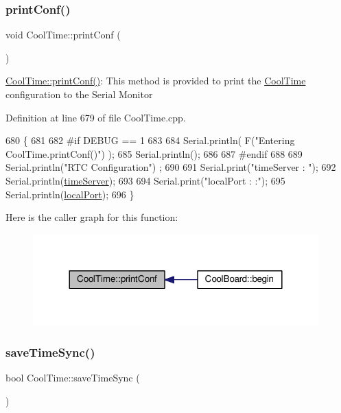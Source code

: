 \subsubsection{\texorpdfstring{print\+Conf()}{printConf()}}
{\footnotesize\ttfamily void Cool\+Time\+::print\+Conf (\begin{DoxyParamCaption}{ }\end{DoxyParamCaption})}

\hyperlink{class_cool_time_af355e7f9b3898211cd2ff25eab5933b1}{Cool\+Time\+::print\+Conf()}\+: This method is provided to print the \hyperlink{class_cool_time}{Cool\+Time} configuration to the Serial Monitor 

Definition at line 679 of file Cool\+Time.\+cpp.


\begin{DoxyCode}
680 \{
681 
682 \textcolor{preprocessor}{#if DEBUG == 1}
683 
684     Serial.println( F(\textcolor{stringliteral}{"Entering CoolTime.printConf()"}) );
685     Serial.println();
686 
687 \textcolor{preprocessor}{#endif }
688 
689     Serial.println(\textcolor{stringliteral}{"RTC Configuration"}) ;
690 
691     Serial.print(\textcolor{stringliteral}{"timeServer : "});
692     Serial.println(\hyperlink{class_cool_time_ad2b9858f399108cb440dd1e908916f04}{timeServer});
693     
694     Serial.print(\textcolor{stringliteral}{"localPort : :"});
695     Serial.println(\hyperlink{class_cool_time_a2f777da44d7ba678be8185299e9b49d1}{localPort});
696 \}
\end{DoxyCode}
Here is the caller graph for this function\+:\nopagebreak
\begin{figure}[H]
\begin{center}
\leavevmode
\includegraphics[width=312pt]{d6/d49/class_cool_time_af355e7f9b3898211cd2ff25eab5933b1_icgraph}
\end{center}
\end{figure}
\mbox{\label{class_cool_time_ae9658c9b377510d469e3b88edf33ee85}} 
\subsubsection{\texorpdfstring{save\+Time\+Sync()}{saveTimeSync()}}
{\footnotesize\ttfamily bool Cool\+Time\+::save\+Time\+Sync (\begin{DoxyParamCaption}{ }\end{DoxyParamCaption})}

